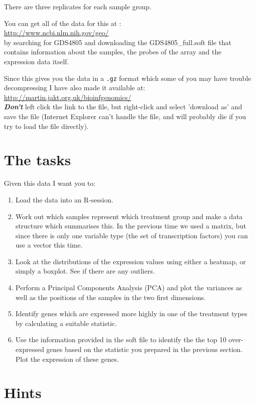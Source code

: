 \documentclass[11pt]{article}
\begin{document}
There are three replicates for each sample group.

You can get all of the data for this at :\\
\url{http://www.ncbi.nlm.nih.gov/geo/}\\

by searching for GDS4805 and downloading the GDS4805\_full.soft file that
contains information about the samples, the probes of the array and
the expression data itself.

Since this gives you the data in a \texttt{.gz} format which some of you may have
trouble decompressing I have also made it available at:\\
\url{http://martin.jakt.org.uk/bioinfgenomics/}\\
{\bfseries \emph{Don't}} left click the link to the file, but right-click and select
'download as' and save the file (Internet Explorer can't handle the file, and will
probably die if you try to load the file directly).

\section{The tasks}
Given this data I want you to:

\begin{enumerate}
\item Load the data into an R-session.
\item Work out which samples represent which
  treatment group and make a data structure which summarises this.
  In the previous time we used a matrix, but since there is only
  one variable type (the set of transcription factors) you can use
  a vector this time.
\item Look at the distributions of the expression values using either
  a heatmap, or simply a boxplot. See if there are any outliers.
\item Perform a Principal Components Analysis (PCA) and plot the variances
  as well as the positions of the samples in the two first dimensions.
\item Identify genes which are expressed more highly in one of the treatment
  types by calculating a suitable statistic.
\item Use the information provided in the soft file to identify the the top 
  10 over-expressed genes based on the statistic
  you prepared in the previous section. Plot the expression of these
  genes.
\end{enumerate}

\section{Hints}
\end{document}

